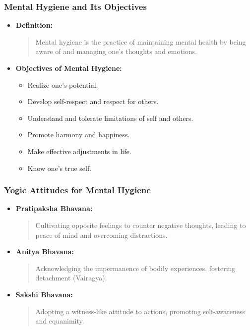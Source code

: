 \begin{frame}[fragile]\frametitle{Mental Hygiene and Its Objectives}

      \begin{itemize}
        \item \textbf{Definition:}
        \begin{quote}
        Mental hygiene is the practice of maintaining mental health by being aware of and managing one's thoughts and emotions.
        \end{quote}
        \item \textbf{Objectives of Mental Hygiene:}
        \begin{itemize}
            \item Realize one's potential.
            \item Develop self-respect and respect for others.
            \item Understand and tolerate limitations of self and others.
            \item Promote harmony and happiness.
            \item Make effective adjustments in life.
            \item Know one's true self.
        \end{itemize}
      \end{itemize}

\end{frame}

\begin{frame}[fragile]\frametitle{Yogic Attitudes for Mental Hygiene}

      \begin{itemize}
        \item \textbf{Pratipaksha Bhavana:}
        \begin{quote}
        Cultivating opposite feelings to counter negative thoughts, leading to peace of mind and overcoming distractions.
        \end{quote}
        \item \textbf{Anitya Bhavana:}
        \begin{quote}
        Acknowledging the impermanence of bodily experiences, fostering detachment (Vairagya).
        \end{quote}
        \item \textbf{Sakshi Bhavana:}
        \begin{quote}
        Adopting a witness-like attitude to actions, promoting self-awareness and equanimity.
        \end{quote}
      \end{itemize}

\end{frame}

